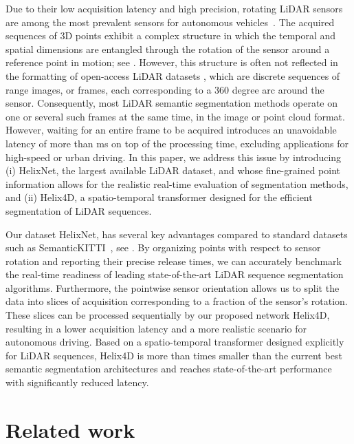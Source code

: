 \documentclass[runningheads]{tpls/llncs}
\begin{document}
Due to their low acquisition latency and high precision, rotating LiDAR sensors are among the most prevalent sensors for autonomous vehicles~\cite{royo2019overview}.
The acquired sequences of 3D points exhibit a complex structure in which the temporal and spatial dimensions are entangled through the rotation of the sensor around a reference point in motion; see .
However, this structure is often not reflected in the formatting of open-access LiDAR datasets \cite{behley2019iccv,jiang2021rellis,Liao2021ARXIV}, which are discrete sequences of range images, or frames, each corresponding to a 360 degree arc around the sensor.
Consequently, most LiDAR semantic segmentation methods operate on one or several such frames at the same time, in the image \cite{cortinhal2020salsanext} or point cloud \cite{zhu2021cylindrical,Zhang_2020_CVPR,tang2020searching} format.
However, waiting for an entire frame to be acquired introduces an unavoidable latency of more than ms on top of the processing time, excluding applications for high-speed or urban driving. In this paper, we address this issue by introducing (i) HelixNet, the largest available LiDAR dataset, and whose fine-grained point information allows for the realistic real-time evaluation of segmentation methods, and (ii) Helix4D, a spatio-temporal transformer designed for the efficient segmentation of LiDAR sequences.

Our dataset HelixNet, has several key advantages compared to standard datasets such as SemanticKITTI~\cite{behley2019iccv}, see . 
By organizing points with respect to sensor rotation and reporting their precise release times, we can accurately benchmark the real-time readiness of leading state-of-the-art LiDAR sequence segmentation algorithms.  
Furthermore, the pointwise sensor orientation allows us to split the data into slices of acquisition corresponding to a fraction of the sensor's rotation. These slices can be processed sequentially by our proposed network Helix4D, resulting in a lower acquisition latency and a more realistic scenario for autonomous driving. 
Based on a spatio-temporal transformer designed explicitly for LiDAR sequences, Helix4D is more than  times smaller than the current best semantic segmentation architectures and reaches state-of-the-art performance with significantly reduced latency. \section{Related work}\label{sec:related_work}
\end{document}
